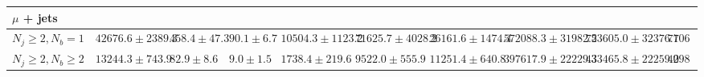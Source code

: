 \begin{sidewaystable}
{\begin{tabular}{l|ccccccc|cc}
        \hline
        \multicolumn{10}{l}{$\mu$ + jets} \\
        \hline
        $N_{j} \geq 2, N_{b} = 1$          & $42676.6 \pm 2389.3$ & $458.4 \pm 47.3$   & $90.1 \pm 6.7$     & $10504.3 \pm 1123.2$   & $71625.7 \pm 4028.2$ & $26161.6 \pm 1474.4$ & $572088.3 \pm 31982.5$ & $723605.0 \pm 32376.7$ & $710650$ \\
        $N_{j} \geq 2, N_{b} \geq 2$       & $13244.3 \pm 743.9$  & $82.9 \pm 8.6$     & $9.0 \pm 1.5$      & $1738.4 \pm 219.6$     & $9522.0 \pm 555.9$   & $11251.4 \pm 640.8$  & $397617.9 \pm 22229.3$ & $433465.8 \pm 22259.0$ & $429861$ \\
        \hline
    \end{tabular}}

    \label{tab:analysis:selection:yieldsShape1}
\end{sidewaystable}